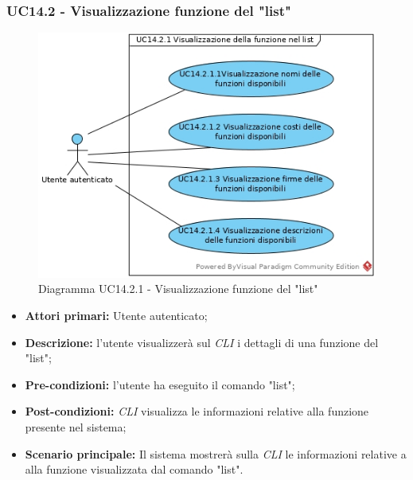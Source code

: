 \subsubsection{UC14.2 - Visualizzazione funzione del "list"}
\begin{figure}[h]
	\centering
	\includegraphics[width=0.7\linewidth]{res/img/UC14.2.1.jpg}
	\caption{Diagramma UC14.2.1 - Visualizzazione funzione del "list"}
\end{figure}
\begin{itemize}
	\item \textbf{Attori primari:} Utente autenticato;
	\item \textbf{Descrizione:} l'utente visualizzerà sul \textit{CLI\glo} i dettagli di una funzione del "list";
	\item \textbf{Pre-condizioni:} l'utente ha eseguito il comando "list";
	\item \textbf{Post-condizioni:} \textit{CLI\glo} visualizza le informazioni relative alla funzione presente nel sistema;
	\item \textbf{Scenario principale:} Il sistema mostrerà sulla \textit{CLI\glo} le informazioni relative a alla funzione visualizzata dal comando "list".
\end{itemize}
